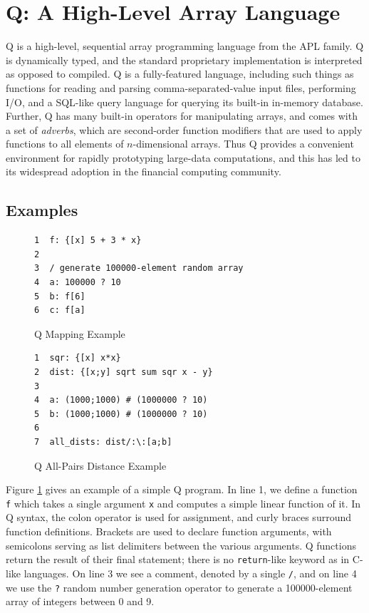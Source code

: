 \documentclass[preprint]{sigplanconf}
\begin{document}
\section{Q: A High-Level Array Language}
\label{Q}

Q is a high-level, sequential array programming language from the APL family.  Q is dynamically typed, and the standard proprietary implementation is interpreted as opposed to compiled.  Q is a fully-featured language, including such things as functions for reading and parsing comma-separated-value input files, performing I/O, and a SQL-like query language for querying its built-in in-memory database.  Further, Q has many built-in operators for manipulating arrays, and comes with a set of {\it adverbs}, which are second-order function modifiers that are used to apply functions to all elements of $n$-dimensional arrays.  Thus Q provides a convenient environment for rapidly prototyping large-data computations, and this has led to its widespread adoption in the financial computing community.

\subsection{Examples}
\begin{figure}
\begin{verbatim}
1  f: {[x] 5 + 3 * x}
2  
3  / generate 100000-element random array
4  a: 100000 ? 10
5  b: f[6]
6  c: f[a]
\end{verbatim}
\caption{Q Mapping Example}
\label{QMap}
\end{figure}

\begin{figure}
\begin{verbatim}
1  sqr: {[x] x*x}
2  dist: {[x;y] sqrt sum sqr x - y}
3  
4  a: (1000;1000) # (1000000 ? 10)
5  b: (1000;1000) # (1000000 ? 10)
6  
7  all_dists: dist/:\:[a;b]
\end{verbatim}
\caption{Q All-Pairs Distance Example}
\label{QAllPairsDist}
\end{figure}

Figure \ref{QMap} gives an example of a simple Q program.  In line 1, we define a function \texttt{f} which takes a single argument \texttt{x} and computes a simple linear function of it.  In Q syntax, the colon operator is used for assignment, and curly braces surround function definitions.  Brackets are used to declare function arguments, with semicolons serving as list delimiters between the various arguments.  Q functions return the result of their final statement; there is no \texttt{return}-like keyword as in C-like languages.  On line 3 we see a comment, denoted by a single \texttt{/}, and on line 4 we use the \texttt{?} random number generation operator to generate a 100000-element array of integers between 0 and 9.
\end{document}

